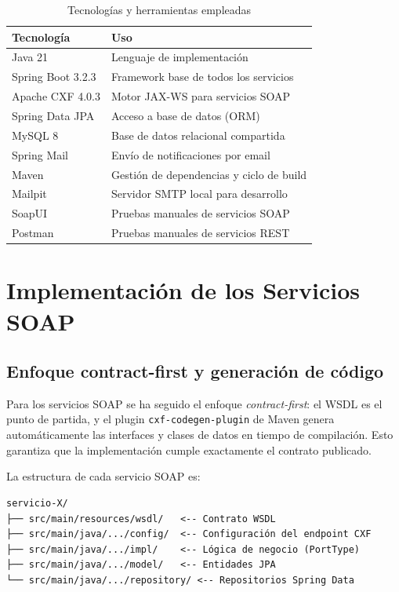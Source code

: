 \documentclass[12pt, a4paper]{article}
\begin{document}
\begin{table}[H]
  \centering
  \begin{tabular}{ll}
    \toprule
    \textbf{Tecnología} & \textbf{Uso} \\
    \midrule
    Java 21             & Lenguaje de implementación \\
    Spring Boot 3.2.3   & Framework base de todos los servicios \\
    Apache CXF 4.0.3    & Motor JAX-WS para servicios SOAP \\
    Spring Data JPA     & Acceso a base de datos (ORM) \\
    MySQL 8             & Base de datos relacional compartida \\
    Spring Mail         & Envío de notificaciones por email \\
    Maven               & Gestión de dependencias y ciclo de build \\
    Mailpit             & Servidor SMTP local para desarrollo \\
    SoapUI              & Pruebas manuales de servicios SOAP \\
    Postman             & Pruebas manuales de servicios REST \\
    \bottomrule
  \end{tabular}
  \caption{Tecnologías y herramientas empleadas}
\end{table}

\section{Implementación de los Servicios SOAP}

\subsection{Enfoque contract-first y generación de código}

Para los servicios SOAP se ha seguido el enfoque \textit{contract-first}: el WSDL es el punto de partida, y el plugin \texttt{cxf-codegen-plugin} de Maven genera automáticamente las interfaces y clases de datos en tiempo de compilación. Esto garantiza que la implementación cumple exactamente el contrato publicado.

La estructura de cada servicio SOAP es:

\begin{verbatim}
servicio-X/
├── src/main/resources/wsdl/   <-- Contrato WSDL
├── src/main/java/.../config/  <-- Configuración del endpoint CXF
├── src/main/java/.../impl/    <-- Lógica de negocio (PortType)
├── src/main/java/.../model/   <-- Entidades JPA
└── src/main/java/.../repository/ <-- Repositorios Spring Data
\end{verbatim}
\end{document}
